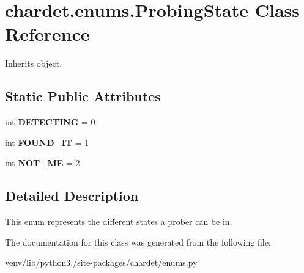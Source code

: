 \hypertarget{classchardet_1_1enums_1_1_probing_state}{}\section{chardet.\+enums.\+Probing\+State Class Reference}
\label{classchardet_1_1enums_1_1_probing_state}


Inherits object.

\subsection*{Static Public Attributes}
\begin{DoxyCompactItemize}
\item 
\mbox{\label{classchardet_1_1enums_1_1_probing_state_af59361e76a548e102f5b70d130ee8866}} 
int {\bfseries D\+E\+T\+E\+C\+T\+I\+NG} = 0
\item 
\mbox{\label{classchardet_1_1enums_1_1_probing_state_ad4ebd856aa7c4139f3902f3b7775cef8}} 
int {\bfseries F\+O\+U\+N\+D\+\_\+\+IT} = 1
\item 
\mbox{\label{classchardet_1_1enums_1_1_probing_state_ab20c27b64d4404b427e3dacf45c8ce6e}} 
int {\bfseries N\+O\+T\+\_\+\+ME} = 2
\end{DoxyCompactItemize}


\subsection{Detailed Description}
\begin{DoxyVerb}This enum represents the different states a prober can be in.
\end{DoxyVerb}
 

The documentation for this class was generated from the following file\+:\begin{DoxyCompactItemize}
\item 
venv/lib/python3./site-\/packages/chardet/enums.\+py\end{DoxyCompactItemize}
